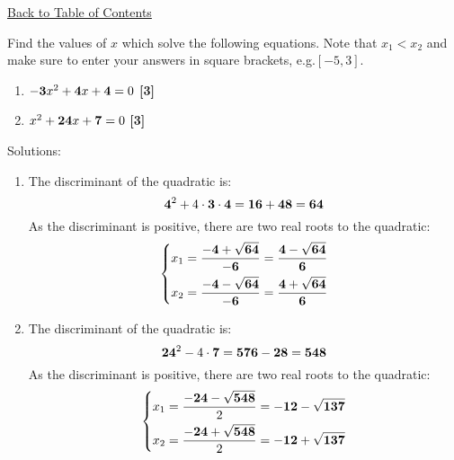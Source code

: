 \documentclass[a4paper, leqno, 12pt]{report}
\newenvironment{top_enumerate}{
\begin{enumerate}
  \setlength{\itemsep}{2em}
  \setlength{\topsep}{-0pt}
  \setlength{\partopsep}{-0pt}
}{\end{enumerate}}
\begin{document}
\hyperlink{contents}{Back to Table of Contents}
\begin{top_enumerate}
\item Find the values of $x$ which solve the following equations. Note that $x_1 < x_2$ and make sure to enter your answers in square brackets, e.g.$[-5,3]$.
 
\setcounter{equation}{0}  %
\begin{multicols}{2}
\begin{enumerate}
	\setlength{\topsep}{-0pt}
	\setlength{\partopsep}{-0pt}
	\setlength{\itemsep}{10pt}
			\item $-{\bf 3}x^2 + {\bf 4}x + {\bf 4} = 0$
	 \quad \textbf{[3]}
		\item $x^2 + {\bf 24}x + {\bf 7} = 0$
	 \quad \textbf{[3]}
\end{enumerate}\end{multicols}\addtocounter{enumi}{-1}
\item Solutions:
 
\setcounter{equation}{0}  %
\begin{enumerate}
	\setlength{\topsep}{-0pt}
	\setlength{\partopsep}{-0pt}
	\setlength{\itemsep}{10pt}
			\item The discriminant of the quadratic is:
	\[
	{\bf 4}^2+4\cdot{\bf 3}\cdot{\bf 4} = {\bf 16} + {\bf 48} = {\bf 64}
	\]
	As the discriminant is positive, there are two real roots to the quadratic:
	\[
	\left\{\begin{aligned}
	x_1 & = \frac{-{\bf 4}+\sqrt{{\bf 64}}}{-{\bf 6}} = \frac{{\bf 4}-\sqrt{{\bf 64}}}{{\bf 6}}\\
	x_2 & = \frac{-{\bf 4}-\sqrt{{\bf 64}}}{-{\bf 6}} = \frac{{\bf 4}+\sqrt{{\bf 64}}}{{\bf 6}}\\
	\end{aligned}\right.
	\]
	 \quad \textbf{}
		\item The discriminant of the quadratic is:
	\[
	{\bf 24}^2-4\cdot{\bf 7} = {\bf 576} - {\bf 28} = {\bf 548}
	\]
	As the discriminant is positive, there are two real roots to the quadratic:
	\[
	\left\{\begin{aligned}
	x_1 & = \frac{-{\bf 24}-\sqrt{{\bf 548}}}{2} = -{\bf 12} - \sqrt{{\bf 137}}\\
	x_2 & = \frac{-{\bf 24}+\sqrt{{\bf 548}}}{2} = -{\bf 12} + \sqrt{{\bf 137}}\\
	\end{aligned}\right.
	\]
	 \quad \textbf{}
\end{enumerate}\newpage
\end{top_enumerate}
\end{document}

